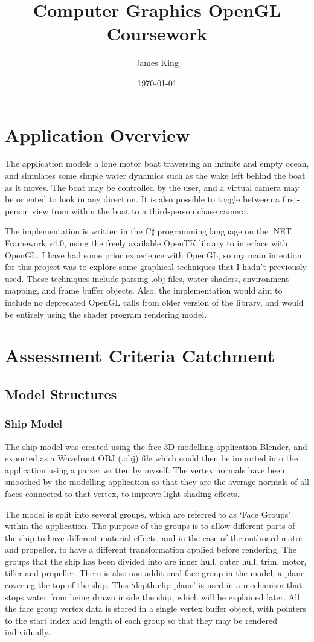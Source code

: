 \documentclass[a4paper,11pt]{article}
\title{Computer Graphics OpenGL Coursework}
\date{\today}
\author{James King}
\begin{document}
\maketitle

\section{Application Overview}
The application models a lone motor boat traversing an infinite and empty ocean, and simulates some simple water dynamics such as the wake left behind the boat as it moves. The boat may be controlled by the user, and a virtual camera may be oriented to look in any direction. It is also possible to toggle between a first-person view from within the boat to a third-person chase camera.

The implementation is written in the C$\sharp$ programming language on the .NET Framework v4.0, using the freely available OpenTK library to interface with OpenGL. I have had some prior experience with OpenGL, so my main intention for this project was to explore some graphical techniques that I hadn't previously used. These techniques include parsing .obj files, water shaders, environment mapping, and frame buffer objects. Also, the implementation would aim to include no deprecated OpenGL calls from older version of the library, and would be entirely using the shader program rendering model.

\section{Assessment Criteria Catchment}
\subsection{Model Structures}
\subsubsection{Ship Model}
The ship model was created using the free 3D modelling application Blender, and exported as a Wavefront OBJ (.obj) file which could then be imported into the application using a parser written by myself. The vertex normals have been smoothed by the modelling application so that they are the average normals of all faces connected to that vertex, to improve light shading effects.

The model is split into several groups, which are referred to as `Face Groups' within the application. The purpose of the groups is to allow different parts of the ship to have different material effects; and in the case of the outboard motor and propeller, to have a different transformation applied before rendering. The groups that the ship has been divided into are inner hull, outer hull, trim, motor, tiller and propeller. There is also one additional face group in the model; a plane covering the top of the ship. This `depth clip plane' is used in a mechanism that stops water from being drawn inside the ship, which will be explained later. All the face group vertex data is stored in a single vertex buffer object, with pointers to the start index and length of each group so that they may be rendered individually.
\end{document}
